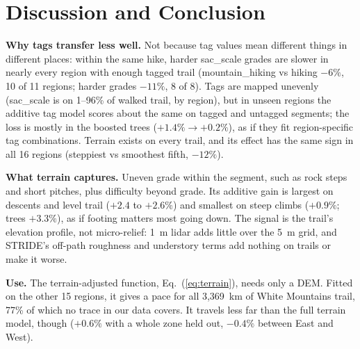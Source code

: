 \section{Discussion and Conclusion}
\label{sec:discussion}


\textbf{Why tags transfer less well.} Not because tag values mean
different things in different places: within the same hike, harder
sac\_scale grades are slower in nearly every region with enough tagged
trail (mountain\_hiking vs hiking $-6\%$, 10 of 11 regions; harder grades
$-11\%$, 8 of 8). Tags are mapped unevenly (sac\_scale is on 1--96\% of
walked trail, by region), but in unseen regions the additive tag model
scores about the same on tagged and untagged segments; the loss is mostly
in the boosted trees ($+1.4\% \to +0.2\%$), as if they fit region-specific
tag combinations. Terrain exists on every trail, and its effect has the
same sign in all 16 regions (steppiest vs smoothest fifth, $-12\%$).

\textbf{What terrain captures.} Uneven grade within the segment, such as
rock steps and short pitches, plus difficulty beyond grade. Its additive
gain is largest on descents and level trail ($+2.4$ to $+2.6\%$) and
smallest on steep climbs ($+0.9\%$; trees $+3.3\%$), as if footing
matters most going down.
The signal is the trail's elevation profile, not micro-relief: 1~m lidar
adds little over the 5~m grid, and STRIDE's off-path roughness and
understory terms add nothing on trails or make it worse.

\textbf{Use.} The terrain-adjusted function, Eq.~(\ref{eq:terrain}), needs only
a DEM. Fitted on the other
15 regions, it gives a pace for all 3,369~km of White Mountains trail,
77\% of which no trace in our data covers. It travels less far than the full terrain model, though
($+0.6\%$ with a whole zone held out, $-0.4\%$ between East and West).

